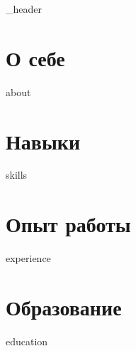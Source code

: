 \documentclass[letter,10pt]{article}
\author{Илья Казаков}
\begin{document}
{_header}
\vspace*{1pt}

\hline
\vspace*{10pt}

\section{О себе}\label{sec:-}
\vspace*{3pt}
{about}
\vspace*{10pt}

\section{Навыки}\label{sec:}
\vspace*{3pt}
{skills}
\vspace*{10pt}

\section{Опыт работы}\label{sec:-2}
\vspace*{3pt}
{experience}
\vspace*{10pt}

\section{Образование}\label{sec:2}
{education}
\vspace*{10pt}
\end{document}
